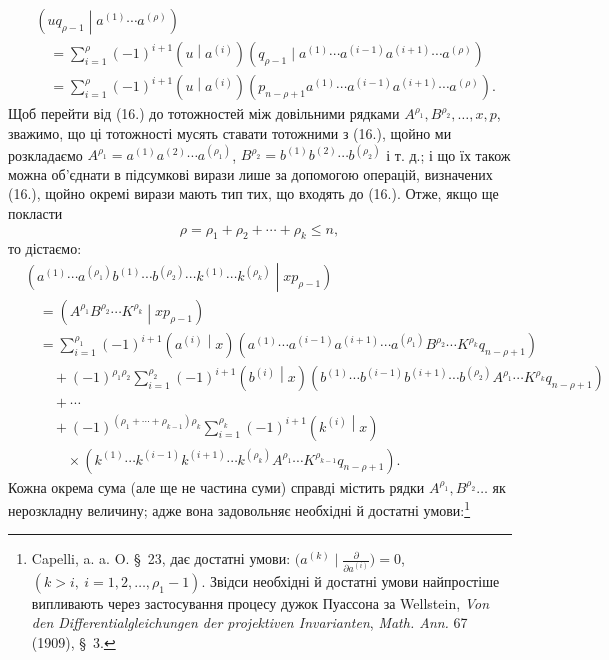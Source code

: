\documentclass[11pt]{article}
\newcommand{\pair}[2]{\left(#1\middle|#2\right)}
\begin{document}
\begin{equation}
\begin{aligned}
&\pair{u q_{\rho-1}}{a^{(1)}\cdots a^{(\rho)}}\\
&\quad=\sum_{i=1}^{\rho}(-1)^{i+1}\pair{u}{a^{(i)}}
(q_{\rho-1}\mid a^{(1)}\cdots a^{(i-1)}a^{(i+1)}\cdots a^{(\rho)})\\
&\quad=\sum_{i=1}^{\rho}(-1)^{i+1}\pair{u}{a^{(i)}}
(p_{n-\rho+1}a^{(1)}\cdots a^{(i-1)}a^{(i+1)}\cdots a^{(\rho)}).
\end{aligned}
\tag{17}
\end{equation}
Щоб перейти від (16.) до тотожностей між довільними рядками $A^{\rho_1},B^{\rho_2},\ldots,x,p$, зважимо, що ці тотожності мусять ставати тотожними з (16.), щойно ми розкладаємо $A^{\rho_1}=a^{(1)}a^{(2)}\cdots a^{(\rho_1)}$, $B^{\rho_2}=b^{(1)}b^{(2)}\cdots b^{(\rho_2)}$ і т. д.; і що їх також можна об'єднати в підсумкові вирази лише за допомогою операцій, визначених (16.), щойно окремі вирази мають тип тих, що входять до (16.). Отже, якщо ще покласти
\begin{equation}
 \rho=\rho_1+\rho_2+\cdots+\rho_k\le n,
\tag{18}
\end{equation}
то дістаємо:
\[
\begin{aligned}
&\pair{a^{(1)}\cdots a^{(\rho_1)}b^{(1)}\cdots b^{(\rho_2)}
\cdots k^{(1)}\cdots k^{(\rho_k)}}{xp_{\rho-1}}\\
&\quad=\pair{A^{\rho_1}B^{\rho_2}\cdots K^{\rho_k}}{xp_{\rho-1}} \\
&\quad=\sum_{i=1}^{\rho_1}(-1)^{i+1}\pair{a^{(i)}}{x}
(a^{(1)}\cdots a^{(i-1)}a^{(i+1)}\cdots a^{(\rho_1)}
B^{\rho_2}\cdots K^{\rho_k}q_{n-\rho+1})\\
&\qquad+(-1)^{\rho_1\rho_2}\sum_{i=1}^{\rho_2}(-1)^{i+1}\pair{b^{(i)}}{x}
(b^{(1)}\cdots b^{(i-1)}b^{(i+1)}\cdots b^{(\rho_2)}
A^{\rho_1}\cdots K^{\rho_k}q_{n-\rho+1})\\
&\qquad+\cdots\\
&\qquad+(-1)^{(\rho_1+\cdots+\rho_{k-1})\rho_k}
\sum_{i=1}^{\rho_k}(-1)^{i+1}\pair{k^{(i)}}{x}\\
&\qquad\quad\times
(k^{(1)}\cdots k^{(i-1)}k^{(i+1)}\cdots k^{(\rho_k)}
A^{\rho_1}\cdots K^{\rho_{k-1}}q_{n-\rho+1}).
\end{aligned}
\]
Кожна окрема сума (але ще не частина суми) справді містить рядки $A^{\rho_1},B^{\rho_2}\ldots$ як нерозкладну величину; адже вона задовольняє необхідні й достатні умови:\footnote{Capelli, a. a. O. \S\ 23, дає достатні умови: $\bigl(a^{(k)}\mid \frac{\partial}{\partial a^{(i)}}\bigr)=0$, $(k>i,\ i=1,2,\ldots,\rho_1-1)$. Звідси необхідні й достатні умови найпростіше випливають через застосування процесу дужок Пуассона за Wellstein, \emph{Von den Differentialgleichungen der projektiven Invarianten}, \emph{Math. Ann.} 67 (1909), \S\ 3.}
\end{document}
